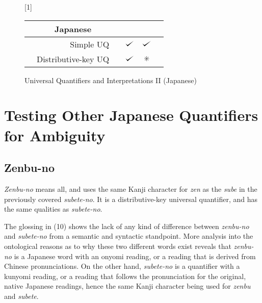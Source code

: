 \documentclass[english, 11pt]{article}
\newcommand{\dwork}{\text{\ding{83}}}
\def\checkmark{\tikz\fill[scale=0.4](0,.35) -- (.25,0) -- (1,.7) -- (.25,.15) -- cycle;}
\begin{document}
\begin{figure}[h]
	\begin{center} \renewcommand*\arraystretch{1.2}
	\scalebox{1}[1]{\begin{tabular}[t]{|rrl||c|c|c|} \hline 
	\multicolumn{3}{|c||}{Japanese} & \sc{Distributive} & \sc{Collective}  \\[0.5ex]
  	 	\hline & Simple UQ 		& & $\checkmark$ & $\checkmark$ \\
		\hline & Distributive-key UQ & & $\checkmark$ & $\dwork$ \\
   	 	\hline 
	\end{tabular}} \renewcommand*\arraystretch{1} \end{center}
	\vspace*{-5mm}
	\captionsetup{labelfont=bf}
	\caption[labelfont=bf]{Universal Quantifiers and Interpretations II (Japanese)}
\end{figure}

\section{Testing Other Japanese Quantifiers for Ambiguity}
\subsection{Zenbu-no}
\emph{Zenbu-no} means all, and uses the same Kanji character for \emph{zen} as the \emph{sube} in the previously covered \emph{subete-no}. It is a distributive-key universal quantifier, and has the same qualities as \emph{subete-no}. 
\begin{exe}
	\ex 
	\begin{xlist}
		\label{1b}
		\label{1b}
	\end{xlist}
\end{exe}
The glossing in (10) shows the lack of any kind of difference between \emph{zenbu-no} and \emph{subete-no} from a semantic and syntactic standpoint. More analysis into the ontological reasons as to why these two different words exist reveals that \emph{zenbu-no} is a Japanese word with an onyomi reading, or a reading that is derived from Chinese pronunciations. On the other hand, \emph{subete-no} is a quantifier with a kunyomi reading, or a reading that follows the pronunciation for the original, native Japanese readings, hence the same Kanji character being used for \emph{zenbu} and \emph{subete}.
\end{document}
